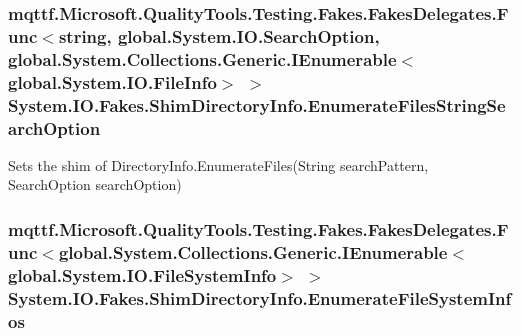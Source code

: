 \hypertarget{class_system_1_1_i_o_1_1_fakes_1_1_shim_directory_info_a610d61acb02ff56a479d504818dd1b1d}{
\subsubsection[{Enumerate\-Files\-String\-Search\-Option}]{\setlength{\rightskip}{0pt plus 5cm}mqttf.\-Microsoft.\-Quality\-Tools.\-Testing.\-Fakes.\-Fakes\-Delegates.\-Func$<$string, global.\-System.\-I\-O.\-Search\-Option, global.\-System.\-Collections.\-Generic.\-I\-Enumerable$<$global.\-System.\-I\-O.\-File\-Info$>$ $>$ System.\-I\-O.\-Fakes.\-Shim\-Directory\-Info.\-Enumerate\-Files\-String\-Search\-Option\hspace{0.3cm}{\ttfamily [set]}}}\label{class_system_1_1_i_o_1_1_fakes_1_1_shim_directory_info_a610d61acb02ff56a479d504818dd1b1d}


Sets the shim of Directory\-Info.\-Enumerate\-Files(\-String search\-Pattern, Search\-Option search\-Option)

\hypertarget{class_system_1_1_i_o_1_1_fakes_1_1_shim_directory_info_aaf0d661a496343c611b2e1338334ede2}{
\subsubsection[{Enumerate\-File\-System\-Infos}]{\setlength{\rightskip}{0pt plus 5cm}mqttf.\-Microsoft.\-Quality\-Tools.\-Testing.\-Fakes.\-Fakes\-Delegates.\-Func$<$global.\-System.\-Collections.\-Generic.\-I\-Enumerable$<$global.\-System.\-I\-O.\-File\-System\-Info$>$ $>$ System.\-I\-O.\-Fakes.\-Shim\-Directory\-Info.\-Enumerate\-File\-System\-Infos\hspace{0.3cm}{\ttfamily [set]}}}\label{class_system_1_1_i_o_1_1_fakes_1_1_shim_directory_info_aaf0d661a496343c611b2e1338334ede2}


